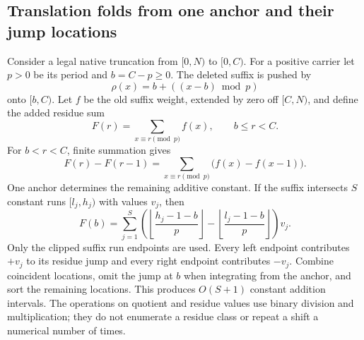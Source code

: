 \subsection{Translation folds from one anchor and their jump locations}

Consider a legal native truncation from $[0,N)$ to $[0,C)$. For a positive
carrier let $p>0$ be its period and $b=C-p\ge0$. The deleted suffix is
pushed by
\[
 \rho(x)=b+((x-b)\bmod p)
\]
onto $[b,C)$. Let $f$ be the old suffix weight, extended by zero off
$[C,N)$, and define the added residue sum
\[
 F(r)=\sum_{x\equiv r\pmod p}f(x),\qquad b\le r<C.
\]
For $b<r<C$, finite summation gives
\begin{equation}\label{eq:lazy-residue-jump}
 F(r)-F(r-1)=\sum_{x\equiv r\pmod p}\bigl(f(x)-f(x-1)\bigr).
\end{equation}
One anchor determines the remaining additive constant. If the suffix
intersects $S$ constant runs $[l_j,h_j)$ with values $v_j$, then
\begin{equation}\label{eq:lazy-residue-anchor}
 F(b)=\sum_{j=1}^{S}
 \left(\left\lfloor\frac{h_j-1-b}{p}\right\rfloor
       -\left\lfloor\frac{l_j-1-b}{p}\right\rfloor\right)v_j.
\end{equation}
Only the clipped suffix run endpoints are used. Every left endpoint
contributes $+v_j$ to its residue jump and every right endpoint contributes
$-v_j$. Combine coincident locations, omit the jump at $b$ when integrating
from the anchor, and sort the remaining locations. This produces $O(S+1)$
constant addition intervals. The operations on quotient and residue values
use binary division and multiplication; they do not enumerate a residue
class or repeat a shift a numerical number of times.

